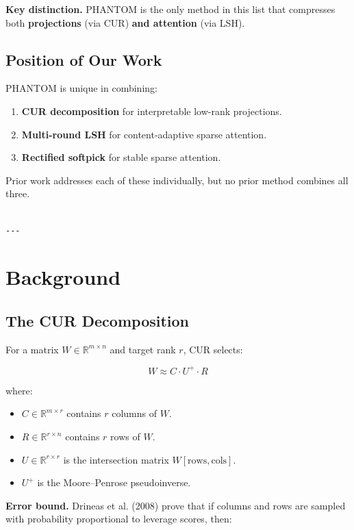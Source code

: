 \textbf{Key distinction.} PHANTOM is the only method in this list that compresses 
both \textbf{projections} (via CUR) \textbf{and attention} (via LSH).

\subsection{Position of Our Work}

PHANTOM is unique in combining:
\begin{enumerate}
\item \textbf{CUR decomposition} for interpretable low-rank projections.
\item \textbf{Multi-round LSH} for content-adaptive sparse attention.
\item \textbf{Rectified softpick} for stable sparse attention.

\end{enumerate}
Prior work addresses each of these individually, but no prior method combines 
all three.
\begin{lstlisting}

---
\end{lstlisting}


\section{Background}

\subsection{The CUR Decomposition}

For a matrix $W \in \mathbb{R}^{m \times n}$ and target rank $r$, CUR selects:

\[
W \approx C \cdot U^+ \cdot R
\tag{3.1}
\]

where:
\begin{itemize}
\item $C \in \mathbb{R}^{m \times r}$ contains $r$ columns of $W$.
\item $R \in \mathbb{R}^{r \times n}$ contains $r$ rows of $W$.
\item $U \in \mathbb{R}^{r \times r}$ is the intersection matrix $W[\text{rows}, \text{cols}]$.
\item $U^+$ is the Moore--Penrose pseudoinverse.

\end{itemize}
\textbf{Error bound.} Drineas et al. (2008) prove that if columns and rows are 
sampled with probability proportional to leverage scores, then:

